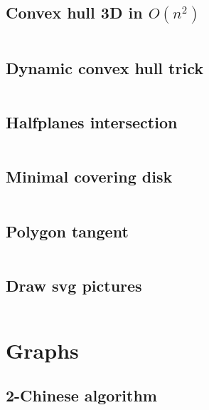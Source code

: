 \documentclass{article}
\begin{document}
\subsection{Convex hull 3D in $O(n ^ 2)$}
\inputminted[mathescape, breaklines, breakafter=(, tabsize=2, frame=lines, showtabs, tab=|\ , tabcolor=lightgray]{c++}{./geometry/convex-hull-3d/convex-hull-3d.cpp}
\subsection{Dynamic convex hull trick}
\inputminted[mathescape, breaklines, breakafter=(, tabsize=2, frame=lines, showtabs, tab=|\ , tabcolor=lightgray]{c++}{./geometry/convex-hull-trick/convex-hull-trick.cpp}
\subsection{Halfplanes intersection}
\inputminted[mathescape, breaklines, breakafter=(, tabsize=2, frame=lines, showtabs, tab=|\ , tabcolor=lightgray]{c++}{./geometry/halfplanes-intersection/halfplanes-intersection.cpp}
\subsection{Minimal covering disk}
\inputminted[mathescape, breaklines, breakafter=(, tabsize=2, frame=lines, showtabs, tab=|\ , tabcolor=lightgray]{c++}{./geometry/min-disk/min-disk.cpp}
\subsection{Polygon tangent}
\inputminted[mathescape, breaklines, breakafter=(, tabsize=2, frame=lines, showtabs, tab=|\ , tabcolor=lightgray]{c++}{./geometry/polygon-tangent/polygon-tangent.cpp}
\subsection{Draw svg pictures}
\inputminted[mathescape, breaklines, breakafter=(, tabsize=2, frame=lines, showtabs, tab=|\ , tabcolor=lightgray]{c++}{./geometry/svg-draw/svg-draw.cpp}
\section{Graphs}
\subsection{2-Chinese algorithm}
\inputminted[mathescape, breaklines, breakafter=(, tabsize=2, frame=lines, showtabs, tab=|\ , tabcolor=lightgray]{c++}{./graphs/2-chinese/2-chinese.cpp}
\end{document}
